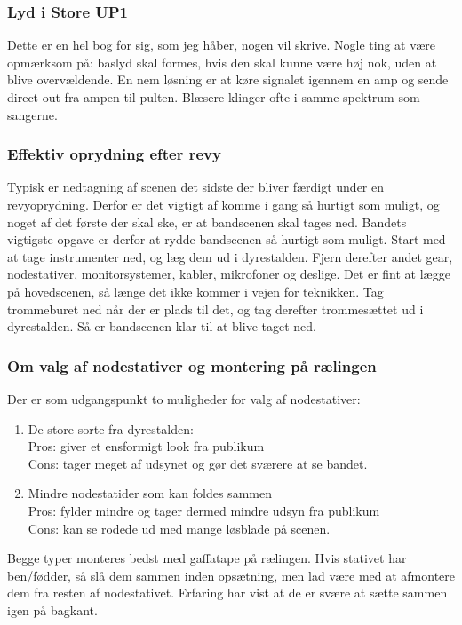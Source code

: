 \subsubsection{Lyd i Store UP1}
Dette er en hel bog for sig, som jeg håber, nogen vil skrive. Nogle ting at være opmærksom på: baslyd skal formes, hvis den skal kunne være høj nok, uden at blive overvældende. En nem løsning er at køre signalet igennem en amp og sende direct out fra ampen til pulten. Blæsere klinger ofte i samme spektrum som sangerne.

\subsubsection{Effektiv oprydning efter revy}
Typisk er nedtagning af scenen det sidste der bliver færdigt under en revyoprydning. Derfor er det vigtigt af komme i gang så hurtigt som muligt, og noget af det første der skal ske, er at bandscenen skal tages ned. Bandets vigtigste opgave er derfor at rydde bandscenen så hurtigt som muligt.
Start med at tage instrumenter ned, og læg dem ud i dyrestalden. Fjern derefter andet gear, nodestativer, monitorsystemer, kabler, mikrofoner og deslige. Det er fint at lægge på hovedscenen, så længe det ikke kommer i vejen for teknikken.
Tag trommeburet ned når der er plads til det, og tag derefter trommesættet ud i dyrestalden.
Så er bandscenen klar til at blive taget ned.

\subsubsection{Om valg af nodestativer og montering på rælingen}
Der er som udgangspunkt to muligheder for valg af nodestativer:
\begin{enumerate}
    \item De store sorte fra dyrestalden:\\
        Pros: giver et ensformigt look fra publikum\\
        Cons: tager meget af udsynet og gør det sværere at se bandet.
    \item Mindre nodestatider som kan foldes sammen\\
        Pros: fylder mindre og tager dermed mindre udsyn fra publikum\\
        Cons: kan se rodede ud med mange løsblade på scenen.
\end{enumerate}

Begge typer monteres bedst med gaffatape på rælingen.
Hvis stativet har ben/fødder, så slå dem sammen inden opsætning, men lad være med at afmontere dem fra resten af nodestativet.
Erfaring har vist at de er svære at sætte sammen igen på bagkant.

